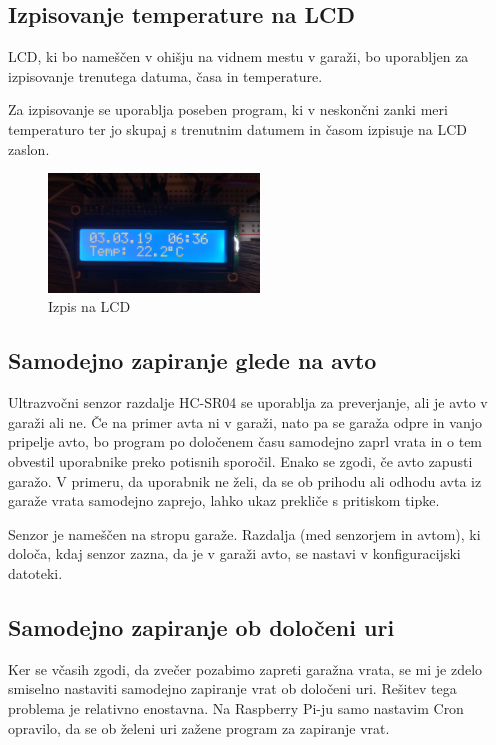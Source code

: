\documentclass[11pt]{article}
\begin{document}
\subsection{Izpisovanje temperature na LCD}
LCD, ki bo nameščen v ohišju na vidnem mestu v garaži, bo uporabljen za izpisovanje trenutega datuma, časa in temperature.

Za izpisovanje se uporablja poseben program, ki v neskončni zanki meri temperaturo ter jo skupaj s trenutnim datumem in časom izpisuje na LCD zaslon.

\begin{figure}[h]
\centering
\includegraphics[width=0.5\textwidth]{images/LCD_temp.jpg}
\caption{Izpis na LCD}
\end{figure}

\subsection{Samodejno zapiranje glede na avto}
Ultrazvočni senzor razdalje HC-SR04 se uporablja za preverjanje, ali je avto v garaži ali ne. Če na primer avta ni v garaži, nato pa se garaža odpre in vanjo pripelje avto, bo program po določenem času samodejno zaprl vrata in o tem obvestil uporabnike preko potisnih sporočil. Enako se zgodi, če avto zapusti garažo. V primeru, da uporabnik ne želi, da se ob prihodu ali odhodu avta iz garaže vrata samodejno zaprejo, lahko ukaz prekliče s pritiskom tipke.

Senzor je nameščen na stropu garaže. Razdalja (med senzorjem in avtom), ki določa, kdaj senzor zazna, da je v garaži avto, se nastavi v konfiguracijski datoteki.


\subsection{Samodejno zapiranje ob določeni uri}
Ker se včasih zgodi, da zvečer pozabimo zapreti garažna vrata, se mi je zdelo smiselno nastaviti samodejno zapiranje vrat ob določeni uri. Rešitev tega problema je relativno enostavna. Na Raspberry Pi-ju samo nastavim Cron opravilo, da se ob želeni uri zažene program za zapiranje vrat.
\end{document}

